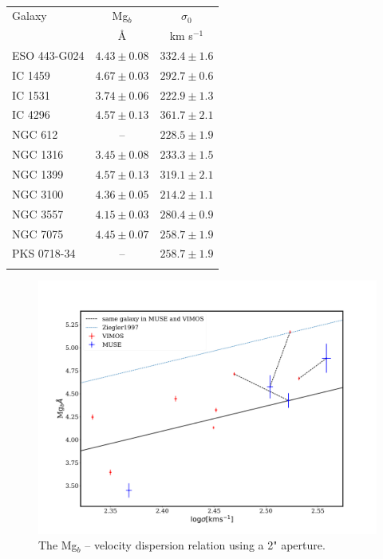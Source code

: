 {{{{			\begin{table}
				\centering
				\caption{}
				\label{tab:globalMg}
				\begin{tabular}{l c c}
					\hline
					\hline
					Galaxy 	& Mg$_b$ & $\sigma_0$ \\
							& \AA 	& km s$^{-1}$ \\
					\hline
					ESO 443-G024 & $4.43 \pm 0.08$ & $332.4 \pm 1.6$ \\
					IC 1459 	& $4.67 \pm 0.03$ & $292.7 \pm 0.6$ \\
					IC 1531 	& $3.74 \pm 0.06$ & $222.9 \pm 1.3$ \\
					IC 4296		& $4.57 \pm 0.13$ & $361.7 \pm 2.1$ \\
					NGC 612 	& --   			  & $228.5 \pm 1.9$ \\
					NGC 1316 	& $3.45 \pm 0.08$ & $233.3 \pm 1.5$ \\
					NGC 1399 	& $4.57 \pm 0.13$ & $319.1 \pm 2.1$ \\
					NGC 3100 	& $4.36 \pm 0.05$ & $214.2 \pm 1.1$ \\
					NGC 3557 	& $4.15 \pm 0.03$ & $280.4 \pm 0.9$ \\
					NGC 7075 	& $4.45 \pm 0.07$ & $258.7 \pm 1.9$ \\
					PKS 0718-34 & -- 		      & $258.7 \pm 1.9$ \\
					\hline \\
				\end{tabular}
			\end{table}

			\begin{figure}
				\centering
				\includegraphics[width=.8\textwidth]{chapter4/Mg_sigma.png}
				\caption[Global Mg$_b$--\textsigma]{The Mg$_b$ -- velocity dispersion relation using a 2" aperture.}
				\label{fig:globalMg}
			\end{figure}

}}}}
